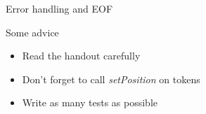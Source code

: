\documentclass{beamer}
\begin{document}
    \begin{frame}{Error handling and EOF}
    \end{frame}


    \begin{frame}{Some advice}
        \begin{itemize}
            \item Read the handout carefully
            \item Don't forget to call \emph{setPosition} on tokens
            \item Write as many tests as possible
        \end{itemize}
    \end{frame}
\end{document}
